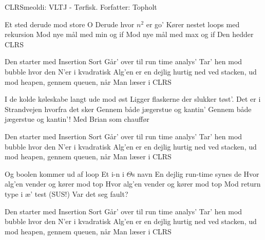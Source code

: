\begin{sang}{CLRS}{meoldi: VLTJ - Tørfisk. Forfatter: Topholt}
    \begin{vers}
    Et sted derude mod store O
    Derude hvor $n^2$ er go'
    Kører nestet loops med rekursion
    Mod nye mål med min og if
    Mod nye mål med max og if
    Den hedder CLRS
    \end{vers}
    
    \begin{omkvaed}
    Den starter med Insertion Sort
    Går' over til run time analys' 
    Tar' hen mod bubble hvor den N'er i kvadratisk
    Alg'en er en dejlig hurtig ned ved stacken, ud mod heapen, gennem queuen, når
    Man læser i CLRS
    \end{omkvaed}
    
    \begin{vers}
    I de kolde køleskabe langt ude mod øst
    Ligger flaskerne der slukker tøst'.
    Det er i Strandvejen hvorfra det sker
    Gennem både jægerstue og kantin'
    Gennem både jægerstue og kantin'!
    Med Brian som chauffør
    \end{vers}
    
    \begin{omkvaed}
    Den starter med Insertion Sort
    Går' over til run time analys' 
    Tar' hen mod bubble hvor den N'er i kvadratisk
    Alg'en er en dejlig hurtig ned ved stacken, ud mod heapen, gennem queuen, når
    Man læser i CLRS
    \end{omkvaed}
    
    \begin{vers}
    Og boolen kommer ud af loop
    Et i-n i $\Theta$s navn
    En dejlig run-time synes de
    Hvor alg'en vender og kører mod top
    Hvor alg'en vender og kører mod top
    Mod return type i æ' test (SUS!)
    Var det seg fault?
    \end{vers}
    
    \begin{omkvaed}
    Den starter med Insertion Sort
    Går' over til run time analys' 
    Tar' hen mod bubble hvor den N'er i kvadratisk
    Alg'en er en dejlig hurtig ned ved stacken, ud mod heapen, gennem queuen, når
    Man læser i CLRS
    \end{omkvaed}
    \end{sang}